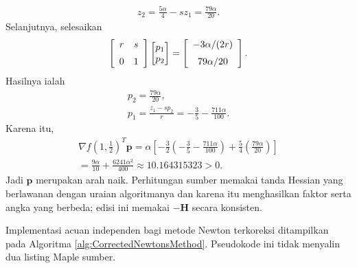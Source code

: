 \begin{example}
\begin{gather*}
z_2=\frac{5\alpha}{4}-s z_1=\frac{79\alpha}{20}.
\end{gather*}
Selanjutnya, selesaikan
\begin{equation}
\left[\begin{array}{cc}r&s\\ \noalign{\medskip}0&1\end{array}\right]
\begin{bmatrix}p_1\\p_2\end{bmatrix}
=\left[\begin{array}{c}-3\alpha/(2r)\\ \noalign{\medskip}79\alpha/20\end{array}\right].
\end{equation}
Hasilnya ialah
\begin{gather*}
p_2=\frac{79\alpha}{20},\\
p_1=\frac{z_1-sp_2}{r}=-\frac35-\frac{711\alpha}{100}.
\end{gather*}
Karena itu,
\begin{multline}
\nabla f\left(1,\tfrac12\right)^T\mathbf{p}
=\alpha\left[-\frac32\left(-\frac35-\frac{711\alpha}{100}\right)
+\frac54\left(\frac{79\alpha}{20}\right)\right]\\
=\frac{9\alpha}{10}+\frac{6241\alpha^2}{400}
\approx10.164315323>0.
\end{multline}
Jadi $\mathbf{p}$ merupakan arah naik. Perhitungan sumber memakai tanda Hessian yang berlawanan dengan uraian algoritmanya dan karena itu menghasilkan faktor serta angka yang berbeda; edisi ini memakai $-\mathbf{H}$ secara konsisten.
\end{example}

\begin{remark} Implementasi acuan independen bagi metode Newton terkoreksi ditampilkan pada Algoritma \ref{alg:CorrectedNewtonsMethod}. Pseudokode ini tidak menyalin dua listing Maple sumber.
\end{remark}

